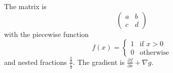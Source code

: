 The matrix is
$$\begin{pmatrix} a & b \\ c & d \end{pmatrix}$$
with the piecewise function
$$f(x) = \begin{cases} 1 & \text{if } x > 0 \\ 0 & \text{otherwise} \end{cases}$$
and nested fractions $\frac{\frac{a}{b}}{\frac{c}{d}}$.
The gradient is $\frac{\partial f}{\partial x} + \nabla g$.
